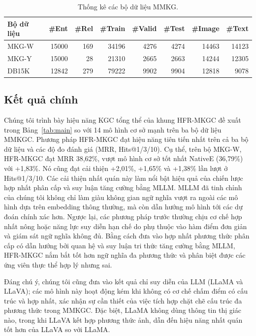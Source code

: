 \documentclass[10pt,twocolumn,a4paper]{article}
\begin{document}
\begin{table}[t]
\centering
\footnotesize
\setlength{\tabcolsep}{2.6pt}
\begin{tabular}{l rrrrrrr}
\toprule
Bộ dữ liệu & \#Ent & \#Rel & \#Train & \#Valid & \#Test & \#Image & \#Text\\
\midrule
MKG-W & 15000 & 169 & 34196 & 4276 & 4274 & 14463 & 14123\\
MKG-Y & 15000 & 28 & 21310 & 2665 & 2663 & 14244 & 12305\\
DB15K & 12842 & 279 & 79222 & 9902 & 9904 & 12818 & 9078\\
\bottomrule
\end{tabular}
\caption{Thống kê các bộ dữ liệu MMKG.}
\label{tab:datasets}
\end{table}

\subsection{Kết quả chính}

Chúng tôi trình bày hiệu năng KGC tổng thể của khung HFR-MKGC đề xuất trong Bảng~\ref{tab:main} so với 14 mô hình cơ sở mạnh trên ba bộ dữ liệu MMKGC. Phương pháp HFR-MKGC đạt hiệu năng tiên tiến nhất trên cả ba bộ dữ liệu và các độ đo đánh giá (MRR, Hits@1/3/10). Cụ thể, trên bộ MKG-W, HFR-MKGC đạt MRR 38,62\%, vượt mô hình cơ sở tốt nhất NativeE (36,79\%) với +1,83\%. Nó cũng đạt cải thiện +2,01\%, +1,65\% và +1,38\% lần lượt ở Hits@1/3/10. Các cải thiện nhất quán này làm nổi bật hiệu quả của chiến lược hợp nhất phân cấp và suy luận tăng cường bằng MLLM. MLLM đã tinh chỉnh của chúng tôi không chỉ làm giàu không gian ngữ nghĩa vượt ra ngoài các mô hình dựa trên embedding thông thường, mà còn dẫn hướng mô hình tới các dự đoán chính xác hơn. Ngược lại, các phương pháp trước thường chịu cơ chế hợp nhất nông hoặc năng lực suy diễn hạn chế do phụ thuộc vào hàm điểm đơn giản và giám sát ngữ nghĩa không đủ. Bằng cách đưa vào hợp nhất phương thức phân cấp có dẫn hướng bởi quan hệ và suy luận tri thức tăng cường bằng MLLM, HFR-MKGC nắm bắt tốt hơn ngữ nghĩa đa phương thức và phân biệt được các ứng viên thực thể hợp lý nhưng sai.

Đáng chú ý, chúng tôi cũng đưa vào kết quả chỉ suy diễn của LLM (LLaMA và LLaVA); các mô hình này hoạt động kém khi không có cơ chế chấm điểm có cấu trúc và hợp nhất, xác nhận sự cần thiết của việc tích hợp chặt chẽ cấu trúc đa phương thức trong MMKGC. Đặc biệt, LLaMA không dùng thông tin thị giác nào, trong khi LLaVA kết hợp phương thức ảnh, dẫn đến hiệu năng nhất quán tốt hơn của LLaVA so với LLaMA.
\end{document}
